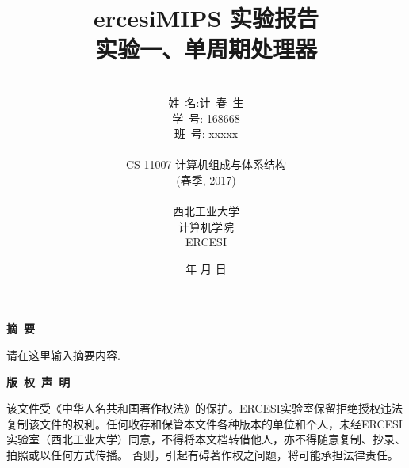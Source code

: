 \documentclass[a4paper]{article}
\begin{document}
\renewcommand{\contentsname}{目录}
\renewcommand{\appendixname}{附录}
\renewcommand{\appendixpagename}{附录}
\renewcommand{\refname}{参考文献} 
\renewcommand{\figurename}{图}
\renewcommand{\tablename}{表}
\renewcommand{\today}{\number\year 年 \number\month 月 \number\day 日}

\title{{\Huge ercesiMIPS 实验报告{\large\linebreak\\}}{\Large 实验一、单周期处理器\linebreak\linebreak}}
\author{\\姓\ 名:计\ 春\ 生\\
学\ 号: 168668\\
班\ 号: xxxxx\\\\
CS 11007 计算机组成与体系结构\\
(春季, 2017)\\\\
西北工业大学\\
计算机学院\\
ERCESI}
\date{\today}
\maketitle
\newpage

\begin{center}
{\Large\bf{摘\ 要\\}}
\end{center}
请在这里输入摘要内容.
\newpage
\begin{center}
{\Large\bf{版\ 权\ 声\ 明\\}}
\end{center}
该文件受《中华人名共和国著作权法》的保护。ERCESI实验室保留拒绝授权违法复制该文件的权利。任何收存和保管本文件各种版本的单位和个人，未经ERCESI实验室（西北工业大学）同意，不得将本文档转借他人，亦不得随意复制、抄录、拍照或以任何方式传播。 否则，引起有碍著作权之问题，将可能承担法律责任。\newpage
\begin{center}
\tableofcontents\label{c}
\end{center}
\newpage

\end{document}
